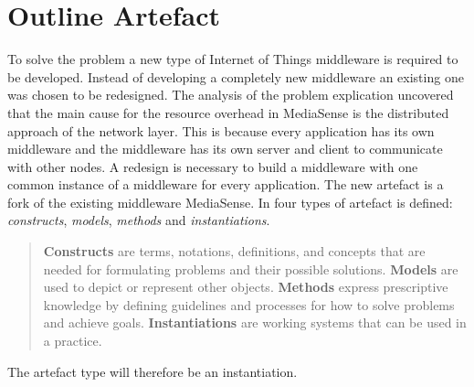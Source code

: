 \section{Outline Artefact}
To solve the problem a new type of Internet of Things middleware is required to be developed. Instead of developing a completely new middleware an existing one was chosen to be redesigned. The analysis of the problem explication uncovered that the main cause for the resource overhead in MediaSense is the distributed approach of the network layer. This is because every application has its own middleware and the middleware has its own server and client to communicate with other nodes. A redesign is necessary to build a middleware with one common instance of a middleware for every application. The new artefact is a fork of the existing middleware MediaSense. In \cite{johannesson2012design} four types of artefact is defined: \emph{constructs}, \emph{models}, \emph{methods} and \emph{instantiations}.  

\begin{quotation}
  \textbf{Constructs} are terms, notations, definitions, and concepts that are needed for formulating problems and their possible solutions.
  \textbf{Models} are used to depict or represent other objects.
  \textbf{Methods} express prescriptive knowledge by defining guidelines and processes for how to solve problems and achieve goals.
  \textbf{Instantiations} are working systems that can be used in a practice.
\end{quotation}
The artefact type will therefore be an instantiation.
